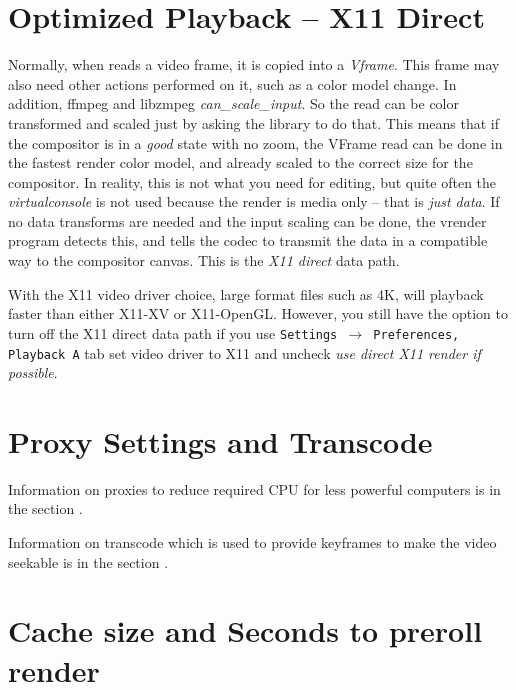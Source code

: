 \section{Optimized Playback -- X11 Direct}%
\label{sec:optimized_playback}

Normally, when \CGG{} reads a video frame, it is copied into a \textit{Vframe}.  This frame may also need other actions performed on it, such as a color model change.  In addition, ffmpeg and libzmpeg \textit{can\_scale\_input}.  So the read can be color transformed and scaled just by asking the library to do that.  This means that if the compositor is in a \textit{good} state with no zoom, the VFrame read can be done in the fastest render color model, and already scaled to the correct size for the compositor.  In reality, this is not what you need for editing, but quite often the \textit{virtualconsole} is not used because the render is media only -- that is \textit{just data}.  If no data transforms are needed and the input scaling can be done, the vrender program detects this, and tells the codec to transmit the data in a compatible way to the compositor canvas. This is the \textit{X11 direct} data path.

With the X11 video driver choice, large format files such as 4K, will playback faster than either X11-XV or X11-OpenGL.  However, you still have the option to turn off the X11 direct data path if you use
\texttt{Settings $\rightarrow$ Preferences, Playback A} tab set video driver to X11 and uncheck \textit{use direct X11 render if possible}.


\section{Proxy Settings and Transcode}%
\label{sec:proxy_settings}

Information on proxies to reduce required CPU for less powerful computers is in the section .

Information on transcode which is used to provide keyframes to make the video seekable is in the section .



\section{Cache size and Seconds to preroll render}%
\label{sec:cache_and_preroll}

